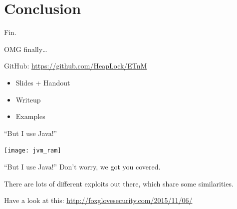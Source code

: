 \documentclass[beamer]{uibk}
\begin{document}
\section*{Conclusion}

\begin{frame}{Fin.}
    \begin{center}
        \huge OMG finally\dots
    \end{center}
    \bigskip
    GitHub: \url{https://github.com/HeapLock/ETnM}
    \begin{itemize}
        \item Slides + Handout
        \item Writeup
        \item Examples
    \end{itemize}
\end{frame}

\begin{frame}{``But I use Java!''}
    \begin{center}
        \texttt{[image: jvm\_ram]}
    \end{center}
\end{frame}

\begin{frame}{``But I use Java!''}
    Don't worry, we got you covered.
    \bigskip

    There are lots of different exploits out there, which share some
    similarities.
    \bigskip

    Have a look at this: \url{http://foxglovesecurity.com/2015/11/06/}
\end{frame}
\end{document}
